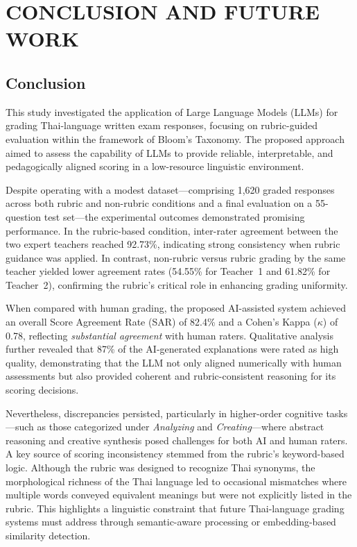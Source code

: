 \chapter{CONCLUSION AND FUTURE WORK}

\section{Conclusion}

This study investigated the application of Large Language 
Models (LLMs) for grading Thai-language written exam 
responses, focusing on rubric-guided evaluation within the 
framework of Bloom’s Taxonomy. The proposed approach aimed to 
assess the capability of LLMs to provide reliable, 
interpretable, and pedagogically aligned scoring in a 
low-resource linguistic environment.

Despite operating with a modest dataset—comprising 1,620 
graded responses across both rubric and non-rubric conditions 
and a final evaluation on a 55-question test set—the 
experimental outcomes demonstrated promising performance. In 
the rubric-based condition, inter-rater agreement between the 
two expert teachers reached 92.73\%, indicating strong 
consistency when rubric guidance was applied. In contrast, 
non-rubric versus rubric grading by the same teacher yielded 
lower agreement rates (54.55\% for Teacher~1 and 61.82\% for 
Teacher~2), confirming the rubric’s critical role in enhancing 
grading uniformity.

When compared with human grading, the proposed AI-assisted 
system achieved an overall Score Agreement Rate (SAR) of 82.4\% 
and a Cohen’s Kappa ($\kappa$) of 0.78, reflecting 
\textit{substantial agreement} with human raters. Qualitative 
analysis further revealed that 87\% of the AI-generated 
explanations were rated as high quality, demonstrating that 
the LLM not only aligned numerically with human assessments 
but also provided coherent and rubric-consistent reasoning for 
its scoring decisions.

Nevertheless, discrepancies persisted, particularly in 
higher-order cognitive tasks—such as those categorized under 
\textit{Analyzing} and \textit{Creating}—where abstract 
reasoning and creative synthesis posed challenges for both AI 
and human raters. A key source of scoring inconsistency 
stemmed from the rubric’s keyword-based logic. Although the 
rubric was designed to recognize Thai synonyms, the 
morphological richness of the Thai language led to occasional 
mismatches where multiple words conveyed equivalent meanings 
but were not explicitly listed in the rubric. This highlights 
a linguistic constraint that future Thai-language grading 
systems must address through semantic-aware processing or 
embedding-based similarity detection.

